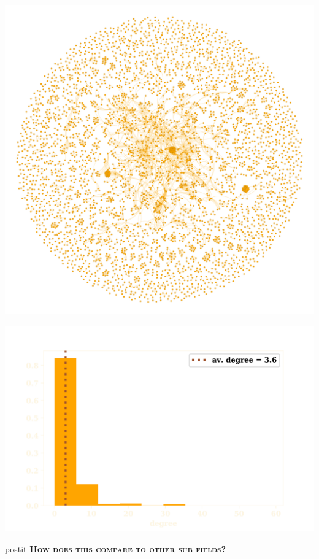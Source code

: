 \documentclass[usenames,dvipsnames,t]{beamer}
\begin{document}
\begin{columns}
\begin{column}{.33\linewidth}
\begin{center}
        \includegraphics[width=.7\textwidth]{static/pd.png}

        \includegraphics[width=.65\textwidth]{static/degree_dist.png}
    \end{center}
    \vspace{.5cm}

    \begin{center}
    \begin{minipage}{4cm}
        \begin{beamercolorbox}[ht=.7cm, sep=.2em, wd=15cm, rounded=true]{postit}
        \textcolor{solarizedBase03}{\small
            \textbf{\textsc{How does this compare to other sub fields?}}}
        \end{beamercolorbox}
    \end{minipage}
    \vspace{1.5cm}


\end{center}
\end{column}
\end{columns}
\end{document}
